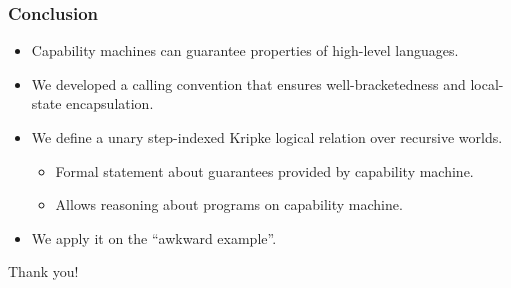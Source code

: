 \documentclass{beamer}
\begin{document}

\begin{frame}
  \frametitle{Conclusion}
  \begin{itemize}
  \item Capability machines can guarantee properties of high-level languages.
  \item We developed a calling convention that ensures well-bracketedness and local-state encapsulation.
  \item We define a unary step-indexed Kripke logical relation over recursive worlds.
    \begin{itemize}
    \item Formal statement about guarantees provided by capability machine.
    \item Allows reasoning about programs on capability machine.
    \end{itemize}
  \item We apply it on the ``awkward example''.
  \end{itemize}
\end{frame}

\begin{frame}
  \centering
  Thank you!
\end{frame}
\end{document}

